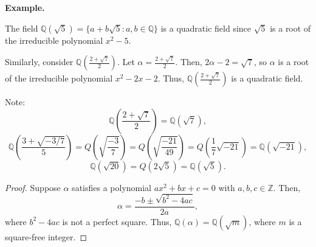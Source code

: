 \documentclass{article}
\newenvironment{example}{%
    \par
    \vspace{5pt}
	\begin{minipage}{\textwidth}
		\noindent\textbf{Example.}
		\tcolorbox[blanker,breakable,left=5mm,parbox=false,
	    before upper={\parindent15pt},
	    after skip=10pt,
		borderline west={1mm}{0pt}{cyan!10!white}]
}{%
		\endtcolorbox
	\end{minipage}
    \vspace{5pt}
}
\begin{document}
\begin{example}
    The field \(\mathbb{Q}(\sqrt{5}) = \{a + b\sqrt{5} : a, b \in \mathbb{Q}\}\) is a quadratic field since \(\sqrt{5}\) is a root of the irreducible polynomial \(x^2 - 5\).

    Similarly, consider \(\mathbb{Q}\left(\frac{2 + \sqrt{7}}{2}\right)\). Let \(\alpha = \frac{2 + \sqrt{7}}{2}\). Then, \(2\alpha - 2 = \sqrt{7}\), so \(\alpha\) is a root of the irreducible polynomial \(x^2 - 2x - 2\). Thus, \(\mathbb{Q}\left(\frac{2 + \sqrt{7}}{2}\right)\) is a quadratic field.

    Note:
    \[
    \mathbb{Q}\left(\frac{2 + \sqrt{7}}{2}\right) = \mathbb{Q}(\sqrt{7}),
    \]
    \[
    \mathbb{Q}\left(\frac{3 + \sqrt{-3/7}}{5}\right) = Q(\sqrt{\frac{-3}{7}}) = Q(\sqrt{\frac{ -21}{49}}) = Q(\frac{1}{7} \sqrt{-21}) = \mathbb{Q}\left(\sqrt{-21}\right),
    \]
    \[
    \mathbb{Q}(\sqrt{20}) = Q(2\sqrt{5}) = \mathbb{Q}(\sqrt{5}).
    \]
\end{example}


\begin{proof}
    Suppose $\alpha$ satisfies a polynomial \(ax^2 + bx + c = 0\) with \(a, b, c \in \mathbb{Z}\). Then,
    \[
    \alpha = \frac{-b \pm \sqrt{b^2 - 4ac}}{2a},
    \]
    where \(b^2 - 4ac\) is not a perfect square. Thus, \(\mathbb{Q}(\alpha) = \mathbb{Q}(\sqrt{m})\), where \(m\) is a square-free integer.

\end{proof}
    
\end{document}
